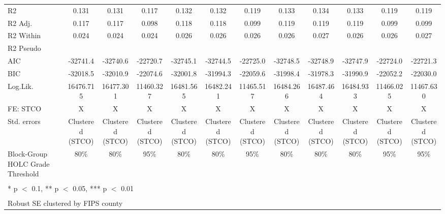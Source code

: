 \documentclass[
]{article}
\begin{document}
\begin{table}
{\begin{tabular}[t]{lccccccccccc}
R2 & 0.131 & 0.131 & 0.117 & 0.132 & 0.132 & 0.119 & 0.133 & 0.134 & 0.133 & 0.119 & 0.119\\
R2 Adj. & 0.117 & 0.117 & 0.098 & 0.118 & 0.118 & 0.099 & 0.119 & 0.119 & 0.119 & 0.099 & 0.099\\
R2 Within & 0.024 & 0.024 & 0.024 & 0.026 & 0.026 & 0.026 & 0.026 & 0.027 & 0.026 & 0.026 & 0.027\\
R2 Pseudo &  &  &  &  &  &  &  &  &  &  & \\
AIC & -32741.4 & -32740.6 & -22720.7 & -32745.1 & -32744.5 & -22725.0 & -32748.5 & -32748.9 & -32747.9 & -22724.0 & -22721.3\\
BIC & -32018.5 & -32010.9 & -22074.6 & -32001.8 & -31994.3 & -22059.6 & -31998.4 & -31978.3 & -31990.9 & -22052.2 & -22030.0\\
Log.Lik. & 16476.715 & 16477.301 & 11460.327 & 16481.565 & 16482.241 & 11465.517 & 16484.266 & 16487.464 & 16484.933 & 11466.025 & 11467.630\\
FE: STCO & X & X & X & X & X & X & X & X & X & X & X\\
Std. errors & Clustered (STCO) & Clustered (STCO) & Clustered (STCO) & Clustered (STCO) & Clustered (STCO) & Clustered (STCO) & Clustered (STCO) & Clustered (STCO) & Clustered (STCO) & Clustered (STCO) & Clustered (STCO)\\
Block-Group HOLC Grade Threshold & 80\% & 80\% & 95\% & 80\% & 80\% & 95\% & 80\% & 80\% & 80\% & 95\% & 95\%\\
\bottomrule
\multicolumn{12}{l}{\textsuperscript{} * p $<$ 0.1, ** p $<$ 0.05, *** p $<$ 0.01}\\
\multicolumn{12}{l}{\textsuperscript{} Robust SE clustered by FIPS county}\\
\end{tabular}}
\end{table}
\end{document}
